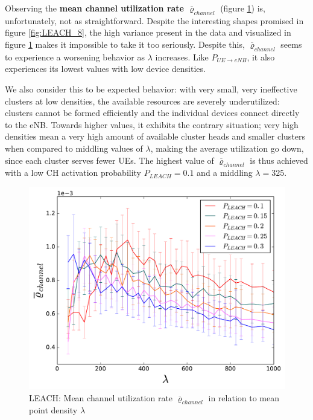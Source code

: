 
Observing the \textbf{mean channel utilization rate $\overline{\varrho}_{channel}$} (figure \ref{fig:LEACHLINES_8}) is, unfortunately, not as straightforward. Despite the interesting shapes promised in figure \ref{fig:LEACH_8}, the high variance present in the data and visualized in figure \ref{fig:LEACHLINES_8} makes it impossible to take it too seriously. Despite this, $\overline{\varrho}_{channel}$ seems to experience a worsening behavior as $\lambda$ increases. Like $P_{UE\rightarrow eNB}$, it also experiences its lowest values with low device densities. 

We also consider this to be expected behavior: with very small, very ineffective clusters at low densities, the available resources are severely underutilized: clusters cannot be formed efficiently and the individual devices connect directly to the eNB. Towards higher values, it exhibits the contrary situation; very high densities mean a very high amount of available cluster heads and smaller clusters when compared to middling values of $\lambda$, making the average utilization go down, since each cluster serves fewer UEs. The highest value of $\overline{\varrho}_{channel}$ is thus achieved with a low CH activation probability $P_{LEACH} = 0.1$ and a middling $\lambda = 325$.

\begin{figure}
\centering
\captionsetup{justification=centering}
\includegraphics[width=0.7\linewidth]{figures/LEACHLINES_8}
\caption{LEACH: Mean channel utilization rate $\overline{\varrho}_{channel}$ in relation to mean point density $\lambda$ }
\label{fig:LEACHLINES_8}
\end{figure}

